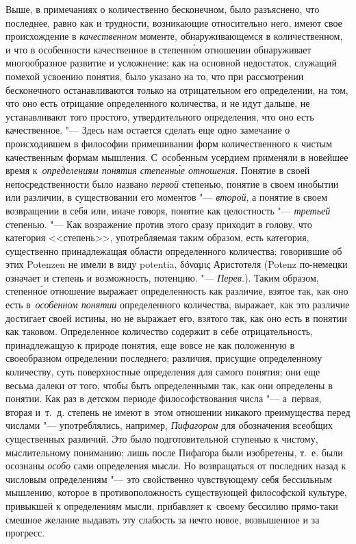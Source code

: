 Выше, в примечаниях о количественно бесконечном, было разъяснено, что
последнее, равно как и трудности, возникающие относительно него, имеют свое
происхождение в {\em качественном} моменте, обнаруживающемся в количественном,
и что в особенности качественное в степенн\'{о}м отношении обнаруживает
многообразное развитие и усложнение; как на основной недостаток, служащий
помехой усвоению понятия, было указано на то, что при рассмотрении бесконечного
останавливаются только на отрицательном его определении, на том, что оно есть
отрицание определенного количества, и не идут дальше, не устанавливают того
простого, утвердительного определения, что оно есть качественное. "--- Здесь
нам остается сделать еще одно замечание о происходившем в философии
примешивании форм количественного к чистым качественным формам мышления.
С~особенным усердием применяли в новейшее время
к~{\em определениям понятия степенн\'{ы}е отношения}. Понятие в своей непосредственности было названо
{\em первой} степенью, понятие в своем инобытии или различии, в существовании
его моментов "--- {\em второй}, а понятие в своем возвращении в себя или, иначе
говоря, понятие как целостность "--- {\em третьей} степенью. "--- Как
возражение против этого сразу приходит в голову, что категория <<степень>>,
употребляемая таким образом, есть категория, существенно принадлежащая области
определенного количества; говорившие об этих Potenzen не имели в виду potentia,
\textgreek{δόναμις} Аристотеля (Potenz по-немецки означает и степень и
возможность, потенцию. "--- {\em Перев.}). Таким образом, степенн\'{о}е
отношение выражает определенность как различие, взятое так, как оно есть
в~{\em особенном понятии} определенного количества, выражает, как это различие
достигает своей истины, но не выражает его, взятого так, как оно есть в понятии
как таковом. Определенное количество содержит в себе отрицательность,
принадлежащую к природе понятия, еще вовсе не как положенную в своеобразном
определении последнего; различия, присущие определенному количеству, суть
поверхностные определения для самого понятия; они еще весьма далеки от того,
чтобы быть определенными так, как они определены в понятии. Как раз в детском
периоде философствования числа "--- а~первая, вторая и~т.~д. степень не имеют
в~этом отношении никакого преимущества перед числами "--- употреблялись,
например, {\em Пифагором} для обозначения всеобщих существенных различий. Это
было подготовительной ступенью к чистому, мыслительному пониманию; лишь после
Пифагора были изобретены, т.~е. были осознаны {\em особо} сами определения
мысли. Но возвращаться от последних назад к числовым определениям "--- это
свойственно чувствующему себя бессильным мышлению, которое в противоположность
существующей философской культуре, привыкшей к определениям мысли, прибавляет
к~своему бессилию прямо-таки смешное желание выдавать эту слабость за нечто
новое, возвышенное и за прогресс.

